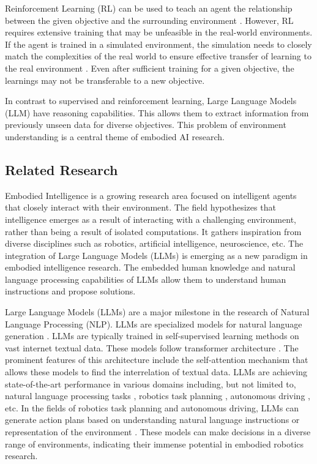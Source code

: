 Reinforcement Learning (RL) can be used to teach an agent the relationship between the given objective and the surrounding environment \cite{sutton2018reinforcement}. However, RL requires extensive training that may be unfeasible in the real-world environments. If the agent is trained in a simulated environment, the simulation needs to closely match the complexities of the real world to ensure effective transfer of learning to the real environment \cite{zhao2020sim}. Even after sufficient training for a given objective, the learnings may not be transferable to a new objective.

In contrast to supervised and reinforcement learning, Large Language Models (LLM) have reasoning capabilities. This allows them to extract information from previously unseen data for diverse objectives. This problem of environment understanding is a central theme of embodied AI research.

\subsection{Related Research}\label{Subsec:LLMRelatedResearch}

Embodied Intelligence is a growing research area focused on intelligent agents that closely interact with their environment. The field hypothesizes that intelligence emerges as a result of interacting with a challenging environment, rather than being a result of isolated computations. It gathers inspiration from diverse disciplines such as robotics, artificial intelligence, neuroscience, etc. The integration of Large Language Models (LLMs) is emerging as a new paradigm in embodied intelligence research. The embedded human knowledge and natural language processing capabilities of LLMs allow them to understand human instructions and propose solutions.

Large Language Models (LLMs) are a major milestone in the research of Natural Language Processing (NLP). LLMs are specialized models for natural language generation \cite{chowdhary2020natural}. LLMs are typically trained in self-supervised learning methods on vast internet textual data. These models follow transformer architecture \cite{vaswani2017attention}. The prominent features of this architecture include the self-attention mechanism that allows these models to find the interrelation of textual data. LLMs are achieving state-of-the-art performance in various domains including, but not limited to, natural language processing tasks \cite{naveed2023comprehensive}, robotics task planning \cite{zeng2023large}, autonomous driving \cite{cui2024survey}, etc. In the fields of robotics task planning and autonomous driving, LLMs can generate action plans based on understanding natural language instructions or representation of the environment \cite{wang2024large}. These models can make decisions in a diverse range of environments, indicating their immense potential in embodied robotics research.

